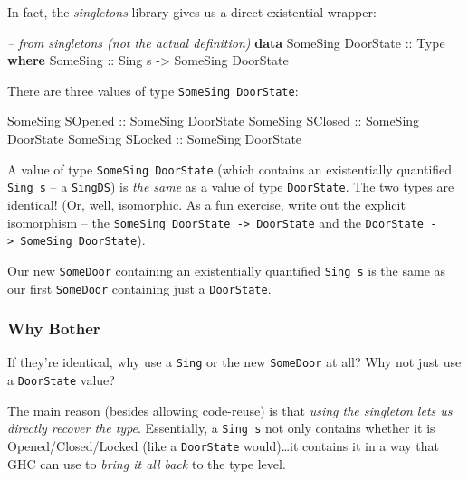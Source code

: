 \documentclass[]{article}
\newenvironment{Shaded}{}{}
\newcommand{\KeywordTok}[1]{\textcolor[rgb]{0.00,0.44,0.13}{\textbf{#1}}}
\newcommand{\DataTypeTok}[1]{\textcolor[rgb]{0.56,0.13,0.00}{#1}}
\newcommand{\CommentTok}[1]{\textcolor[rgb]{0.38,0.63,0.69}{\textit{#1}}}
\newcommand{\OtherTok}[1]{\textcolor[rgb]{0.00,0.44,0.13}{#1}}
\newcommand{\NormalTok}[1]{#1}
\begin{document}
In fact, the \emph{singletons} library gives us a direct existential wrapper:

\begin{Shaded}
\begin{Highlighting}[]
\CommentTok{-- from singletons (not the actual definition)}
\KeywordTok{data} \DataTypeTok{SomeSing} \DataTypeTok{DoorState}\OtherTok{ ::} \DataTypeTok{Type} \KeywordTok{where}
    \DataTypeTok{SomeSing}\OtherTok{ ::} \DataTypeTok{Sing}\NormalTok{ s }\OtherTok{->} \DataTypeTok{SomeSing} \DataTypeTok{DoorState}
\end{Highlighting}
\end{Shaded}

There are three values of type \texttt{SomeSing\ DoorState}:

\begin{Shaded}
\begin{Highlighting}[]
\DataTypeTok{SomeSing} \DataTypeTok{SOpened}\OtherTok{ ::} \DataTypeTok{SomeSing} \DataTypeTok{DoorState}
\DataTypeTok{SomeSing} \DataTypeTok{SClosed}\OtherTok{ ::} \DataTypeTok{SomeSing} \DataTypeTok{DoorState}
\DataTypeTok{SomeSing} \DataTypeTok{SLocked}\OtherTok{ ::} \DataTypeTok{SomeSing} \DataTypeTok{DoorState}
\end{Highlighting}
\end{Shaded}

A value of type \texttt{SomeSing\ DoorState} (which contains an existentially
quantified \texttt{Sing\ s} -- a \texttt{SingDS}) is \emph{the same} as a value
of type \texttt{DoorState}. The two types are identical! (Or, well, isomorphic.
As a fun exercise, write out the explicit isomorphism -- the
\texttt{SomeSing\ DoorState\ -\textgreater{}\ DoorState} and the
\texttt{DoorState\ -\textgreater{}\ SomeSing\ DoorState}).

Our new \texttt{SomeDoor} containing an existentially quantified
\texttt{Sing\ s} is the same as our first \texttt{SomeDoor} containing just a
\texttt{DoorState}.

\subsubsection{Why Bother}\label{why-bother}

If they're identical, why use a \texttt{Sing} or the new \texttt{SomeDoor} at
all? Why not just use a \texttt{DoorState} value?

The main reason (besides allowing code-reuse) is that \emph{using the singleton
lets us directly recover the type}. Essentially, a \texttt{Sing\ s} not only
contains whether it is Opened/Closed/Locked (like a \texttt{DoorState}
would)\ldots{}it contains it in a way that GHC can use to \emph{bring it all
back} to the type level.
\end{document}
